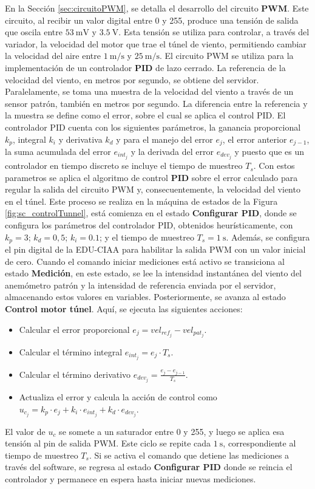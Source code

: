En la Sección \ref{sec:circuitoPWM}, se detalla el desarrollo del circuito \textbf{PWM}. Este circuito, al recibir un valor digital entre 0 y 255, produce una tensión de salida que oscila entre $\SI{53}{\milli\volt}$ y $\SI{3.5}{\volt}$. Esta tensión se utiliza para controlar, a través del variador, la velocidad del motor que trae el túnel de viento, permitiendo cambiar la velocidad del aire entre $\SI{1}{\meter\per\second}$ y $\SI{25}{\meter\per\second}$. El circuito PWM se utiliza para la implementación de un controlador \textbf{PID} de lazo cerrado. La referencia de la velocidad del viento, en metros por segundo, se obtiene del servidor. Paralelamente, se toma una muestra de la velocidad del viento a través de un sensor patrón, también en metros por segundo. La diferencia entre la referencia y la muestra se define como el error, sobre el cual se aplica el control PID. El controlador PID cuenta con los siguientes parámetros, la ganancia proporcional $k_{p}$, integral $k_{i}$ y derivativa $k_{d}$ y para el manejo del error $e_{j}$, el error anterior $e_{j-1}$, la suma acumulada del error $e_{int_{j}}$ y la derivada del error $e_{dev_{j}}$ y puesto que es un controlador en tiempo discreto se incluye el tiempo de muestreo $T_{s}$. Con estos parametros se aplica el algoritmo de control \textbf{PID} sobre el error calculado para regular la salida del circuito PWM y, consecuentemente, la velocidad del viento en el túnel. Este proceso se realiza en la máquina de estados de la Figura \ref{fig:sc_controlTunnel}, está comienza en el estado \textbf{Configurar PID}, donde se configura los parámetros del controlador PID, obtenidos heurísticamente, con $k_{p} = 3$; $k_{d} = 0,5$; $k_{i} = 0.1$; y el tiempo de muestreo $T_{s} = \SI{1}{\second}$. Además, se configura el pin digital de la EDU-CIAA para habilitar la salida PWM con un valor inicial de cero. Cuando el comando iniciar mediciones está activo se transiciona al estado \textbf{Medición}, en este estado, se lee la intensidad instantánea del viento del anemómetro patrón y la intensidad de referencia enviada por el servidor, almacenando estos valores en variables. Posteriormente, se avanza al estado \textbf{Control motor túnel}. Aquí, se ejecuta las siguientes acciones:
\begin{itemize}
    \item Calcular el error proporcional $e_{j} = vel_{ref_{j}} - vel_{pat_{j}}$.
    \item Calcular el término integral $e_{int_{j}} = e_{j} \cdot T_{s}$.
    \item Calcular el término derivativo $e_{dev_{j}} = \frac{e_{j} - e_{j-1}}{T_{s}}$.
    \item Actualiza el error y calcula la acción de control como $u_{c_{j}} = k_{p} \cdot e_{j} + k_{i} \cdot e_{int_{j}} + k_{d} \cdot e_{dev_{j}}$.
\end{itemize}
El valor de $u_{c}$ se somete a un saturador entre 0 y 255, y luego se aplica esa tensión al pin de salida PWM. Este ciclo se repite cada $\SI{1}{\second}$, correspondiente al tiempo de muestreo $T_{s}$. Si se activa el comando que detiene las mediciones a través del software, se regresa al estado \textbf{Configurar PID} donde se reincia el controlador y permanece en espera hasta iniciar nuevas mediciones.


